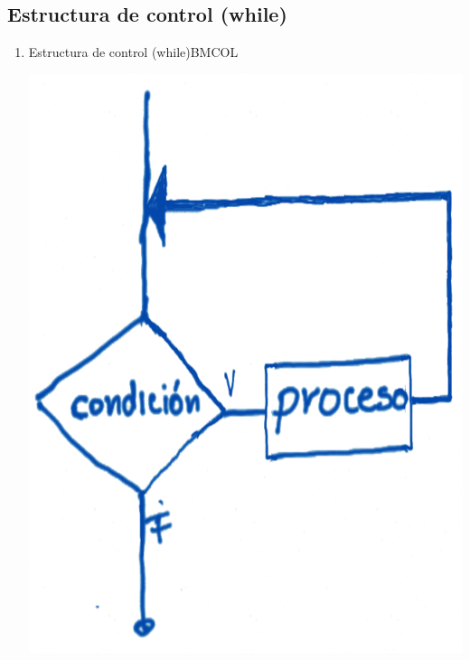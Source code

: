 \documentclass[presentation, aspectratio=54]{beamer}
\begin{document}
\subsection{Estructura de control (while)}
\label{sec:org64be992}
\begin{enumerate}
\item Estructura de control (while)\hfill{}\textsc{BMCOL}
\label{sec:orgc80bed4}
\begin{center}
\includegraphics[width=.9\linewidth]{./images/codigo/for.png}
\end{center}


\end{enumerate}
\end{document}
